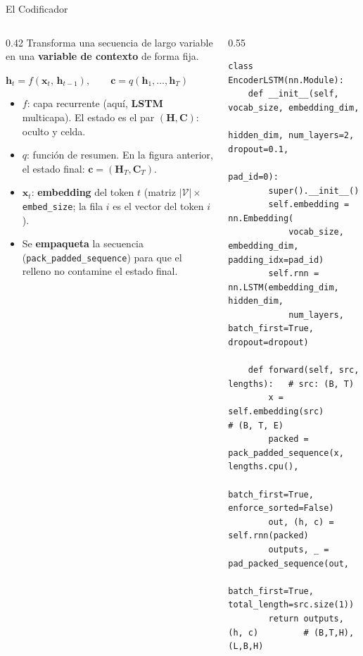 \documentclass[aspectratio=169, 10pt]{beamer}
\newcommand{\V}{\mathcal{V}}
\newcommand{\formula}[1]{%
	\begin{tcolorbox}[colback=UCMBlue!8, colframe=UCMBlue, arc=4pt,
		boxsep=2pt, left=6pt, right=6pt, top=3pt, bottom=3pt]
		#1
	\end{tcolorbox}
}
\begin{document}
\begin{frame}[fragile]{El Codificador}

	\begin{columns}[T]
		\begin{column}{0.42\textwidth}
			\small
			Transforma una secuencia de largo variable en una \textbf{variable de contexto} de forma fija.
			\formula{\centering $\mathbf{h}_t = f(\mathbf{x}_t,\, \mathbf{h}_{t-1}), \qquad \mathbf{c} = q(\mathbf{h}_1,\ldots,\mathbf{h}_T)$}
			\begin{itemize}
				\item $f$: capa recurrente (aqu\'i, \textbf{LSTM} multicapa). El estado es el par $(\mathbf{H},\mathbf{C})$: oculto y celda.
				\item $q$: funci\'on de resumen. En la figura anterior, el estado final: $\mathbf{c}=(\mathbf{H}_T,\mathbf{C}_T)$.
				\item $\mathbf{x}_t$: \textbf{embedding} del token $t$ (matriz $|\V|\times$ \texttt{embed\_size}; la fila $i$ es el vector del token $i$).
				\item Se \textbf{empaqueta} la secuencia (\texttt{pack\_padded\_sequence}) para que el relleno no contamine el estado final.
			\end{itemize}
		\end{column}

		\begin{column}{0.55\textwidth}
			\begin{tcolorbox}[codebox]
\scriptsize
\begin{verbatim}
class EncoderLSTM(nn.Module):
    def __init__(self, vocab_size, embedding_dim,
                 hidden_dim, num_layers=2, dropout=0.1,
                 pad_id=0):
        super().__init__()
        self.embedding = nn.Embedding(
            vocab_size, embedding_dim, padding_idx=pad_id)
        self.rnn = nn.LSTM(embedding_dim, hidden_dim,
            num_layers, batch_first=True, dropout=dropout)

    def forward(self, src, lengths):   # src: (B, T)
        x = self.embedding(src)        # (B, T, E)
        packed = pack_padded_sequence(x, lengths.cpu(),
            batch_first=True, enforce_sorted=False)
        out, (h, c) = self.rnn(packed)
        outputs, _ = pad_packed_sequence(out,
            batch_first=True, total_length=src.size(1))
        return outputs, (h, c)         # (B,T,H), (L,B,H)
\end{verbatim}
			\end{tcolorbox}
		\end{column}
	\end{columns}

\end{frame}
\end{document}
